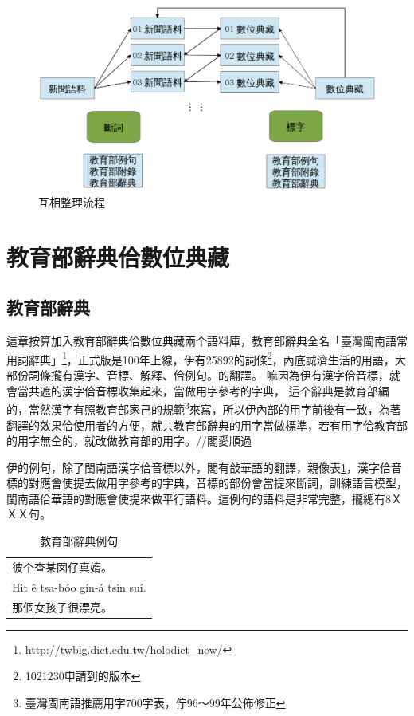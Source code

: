 \documentclass[final,oneside,onecolumn,12pt,a4paper]{book}%
\begin{document}
\begin{figure}
\centerline{\includegraphics[keepaspectratio,width=40em]{圖/互相整理架構}}
\caption{互相整理流程}
\label{圖：互相整理架構}
\end{figure}


\section{教育部辭典佮數位典藏}
\label{節：教育部語料佮數位典藏}
\subsection{教育部辭典}
\label{節：教育部辭典}
這章按算加入教育部辭典佮數位典藏兩个語料庫，教育部辭典全名「臺灣閩南語常用詞辭典」\footnote{\url{http://twblg.dict.edu.tw/holodict_new/}}，正式版是100年上線，伊有25892的詞條\footnote{1021230申請到的版本}，內底誠濟生活的用語，大部份詞條攏有漢字、音標、解釋、佮例句。的翻譯。
嘛因為伊有漢字佮音標，就會當共遮的漢字佮音標收集起來，當做用字參考的字典，
這个辭典是教育部編的，當然漢字有照教育部家己的規範\footnote{臺灣閩南語推薦用字700字表，佇96～99年公佈修正}來寫，所以伊內部的用字前後有一致，為著翻譯的效果佮使用者的方便，就共教育部辭典的用字當做標準，若有用字佮教育部的用字無仝的，就改做教育部的用字。//閣愛順過

伊的例句，除了閩南語漢字佮音標以外，閣有敆華語的翻譯，親像表\ref{表：教育部辭典例句}，漢字佮音標的對應會使提去做用字參考的字典，音標的部份會當提來斷詞，訓練語言模型，閩南語佮華語的對應會使提來做平行語料。這例句的語料是非常完整，攏總有8ＸＸＸ句。
\begin{table}
\caption{教育部辭典例句}
\label{表：教育部辭典例句}
\centering
\begin{tabular}{l}
彼个查某囡仔真媠。 \\
Hit ê tsa-bóo gín-á tsin suí.\\
那個女孩子很漂亮。\\
\end{tabular}
\end{table}
\end{document}
